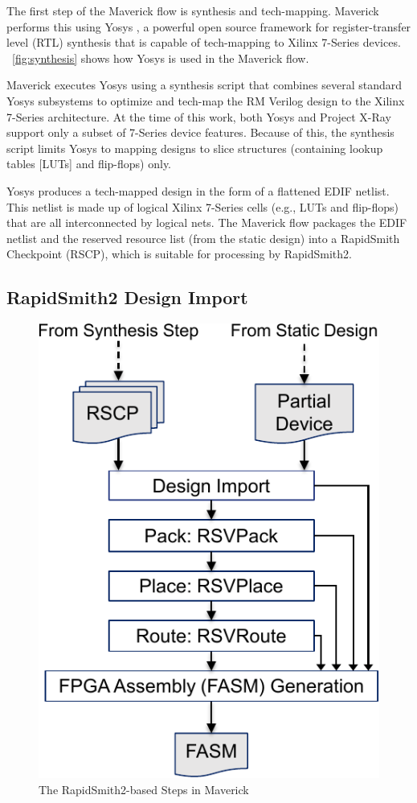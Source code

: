 The first step of the Maverick flow is synthesis and tech-mapping. 
Maverick performs this using Yosys \cite{Wolf:2013}, a powerful open source framework for register-transfer level (RTL) synthesis that is capable of tech-mapping to Xilinx 7-Series devices. 
\figurename~\ref{fig:synthesis} shows how Yosys is used in the Maverick flow. 

Maverick executes Yosys using a synthesis script that combines several standard Yosys subsystems to optimize and tech-map the RM Verilog design to the Xilinx 7-Series architecture. 
At the time of this work, both Yosys and Project X-Ray support only a subset of 7-Series device features.
Because of this, the synthesis script limits Yosys to mapping designs to slice structures (containing lookup tables [LUTs] and flip-flops) only.

Yosys produces a tech-mapped design in the form of a flattened EDIF netlist.
This netlist is made up of logical Xilinx 7-Series cells (e.g., LUTs and flip-flops) that are all interconnected by logical nets.   
The Maverick flow packages the EDIF netlist and the reserved resource list (from the static design) into a RapidSmith Checkpoint (RSCP), which is suitable for processing by RapidSmith2.

\subsection{RapidSmith2 Design Import}
\begin{figure}
	\centering
	\includegraphics[width=0.58\columnwidth]{figures/rs2_steps.pdf}
	\caption{The RapidSmith2-based Steps in Maverick}
	\label{fig:rs2_steps}
\end{figure}

